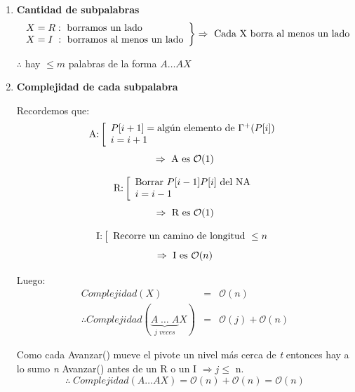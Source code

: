 \documentclass[12pt,a4paper]{report}
\begin{document}
  			\begin{enumerate}
  				\item \textbf{Cantidad de subpalabras}
  					\begin{equation*}
  						\left.
  						\begin{array}{l}
  							X = R: \textup{ borramos un lado} \\
  							X = I \; : \textup{ borramos al menos un lado}
  						\end{array}
  						\right\rbrace
  						\Rightarrow \textup{ Cada X borra al menos un lado}
  					\end{equation*}
  					\begin{center}
  						$\therefore$ hay $\leq m$ palabras de la forma $A \dotsc A X$
  					\end{center}
  				\item \textbf{Complejidad de cada subpalabra}
  					\par Recordemos que:
  					\begin{equation*}
  						\textup{A:}
  						\left[
  						\begin{array}{l}
  							P[i + 1] = \textup{algún elemento de } \Gamma^{+}(P[i]) \\
  							i = i + 1
  						\end{array}
  						\right.
  					\end{equation*}
  					\[ \Rightarrow \textup{ A es } \mathcal{O}(1) \]

  					\begin{equation*}
  						\textup{R:}
  						\left[
  						\begin{array}{l}
  							\textup{Borrar } P[i - 1]P[i] \textup{ del NA} \\
  							i = i - 1
  						\end{array}
  						\right.
  					\end{equation*}
  					\[ \Rightarrow \textup{ R es } \mathcal{O}(1) \]

  					\begin{equation*}
  						\textup{I:}
  						\left[
  						\begin{array}{l}
  							\textup{Recorre un camino de longitud } \leq n
  						\end{array}
  						\right.
  					\end{equation*}
  					\[ \Rightarrow \textup{ I es } \mathcal{O}(n) \]

  					\par Luego:
  					\begin{eqnarray}
  						\nonumber Complejidad(X) &=& \mathcal{O}(n) \\
  						\nonumber \therefore Complejidad (\underbrace{A \; \dotsc \; A}_{j \; veces}X) &=&\mathcal{O}(j) + \mathcal{O}(n)
  					\end{eqnarray}

  					\par Como cada Avanzar() mueve el pivote un nivel más cerca de \textit{t} entonces hay a lo sumo \textit{n} Avanzar() antes de un R o un I $\Rightarrow j\leq$ n.
  					\[ \therefore \; Complejidad(A \dotsc AX) = \mathcal{O}(n) + \mathcal{O}(n) = \mathcal{O}(n)\]
  			\end{enumerate}
\end{document}
